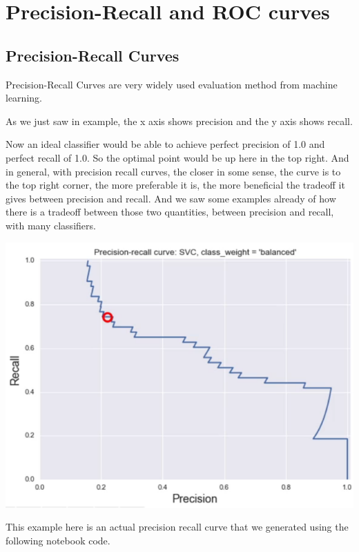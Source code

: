 \section{Precision-Recall and ROC curves}
\begin{multicols}{2}

\subsection{Precision-Recall Curves}

Precision-Recall Curves are very widely used evaluation method from machine learning. 

As we just saw in example, the x axis shows precision and the y axis shows recall. 

Now an ideal classifier would be able to achieve perfect precision of 1.0 and perfect recall of 1.0. So the optimal point would be up here in the top right. And in general, with precision recall curves, the closer in some sense, the curve is to the top right corner, the more preferable it is, the more beneficial the tradeoff it gives between precision and recall. And we saw some examples already of how there is a tradeoff between those two quantities, between precision and recall, with many classifiers. 


\begin{center}
\includegraphics[width=\linewidth]{img/Precision-Recall-curve.png} 
\end{center}

This example here is an actual precision recall curve that we generated using the following notebook code. 


\end{multicols}
